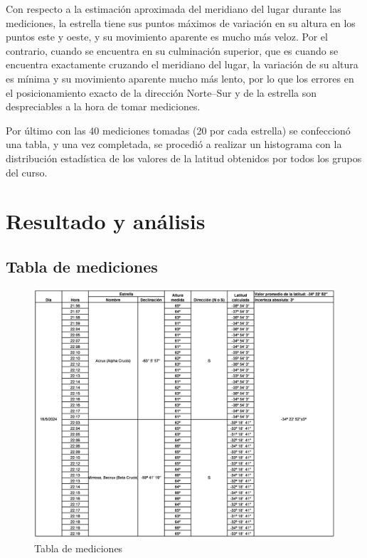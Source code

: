 \documentclass[12pt, a4paper]{article} %
\begin{document}
Con respecto a la estimación aproximada del meridiano del lugar durante las mediciones, la estrella tiene sus puntos máximos de variación en su altura en los puntos este y oeste, y su movimiento aparente es mucho más veloz. Por el contrario, cuando se encuentra en su culminación superior, que es cuando se encuentra exactamente cruzando el meridiano del lugar, la variación de su altura es mínima y su movimiento aparente mucho más lento, por lo que los errores en el  posicionamiento exacto de la dirección Norte–Sur y de la estrella son despreciables a la hora de tomar mediciones.

Por último con las 40 mediciones tomadas (20 por cada estrella) se confeccionó una tabla, y una vez completada, se procedió a realizar un histograma con la distribución estadística de los valores de la latitud obtenidos por todos los grupos del curso.


\section{Resultado y análisis}
\subsection{Tabla de mediciones}
\begin{figure}[H]
    \centering
    \includegraphics[width=15cm]{images/tabla-TP-1-Ian_Chen_y_Lola_Cavalieri .jpg}
    \caption{Tabla de mediciones}
    \label{fig:tabla-mediciones}
\end{figure}
\end{document}

